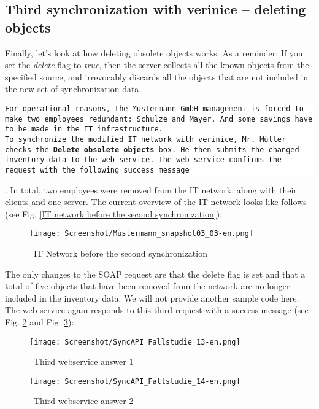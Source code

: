 \documentclass[a4paper,10pt]{book}
\begin{document}
\subsection{ Third synchronization with verinice – deleting objects}
Finally, let's look at how deleting obsolete objects works. As a reminder: If you set the \textit{delete} flag to \textit{true}, then
the server collects all the known objects from the specified source, and irrevocably discards all the objects that are not included
in the new set of synchronization data.
\newline
\newline
\colorbox{white}{\parbox{\textwidth}{
{\tt For operational reasons, the Mustermann GmbH management is forced to make two employees redundant: Schulze and Mayer. And some
savings have to be made in the IT infrastructure.
\newline\\
To synchronize the modified IT network with verinice, Mr. Müller checks the \textbf{Delete obsolete objects} box. He then submits the
changed inventory data to the web service. The web service confirms the request with the following success message}}}.
\newline
\newline
In total, two employees were removed from the IT network, along with their clients and one server. The current overview of the IT network
looks like follows (see Fig. \ref{IT network before the second synchronization}):
\newline
\begin{figure}[htb!]
  \centering
  \texttt{[image: Screenshot/Mustermann\_snapshot03\_03-en.png]}
  \caption{\label{IT Network before the second synchronization} \ IT Network before the second synchronization}
\end{figure}
\newline
The only changes to the SOAP request are that the delete flag is set and that a total of five objects that have been removed from the
network are no longer included in the inventory data. We will not provide another sample code here.
\newline\\
The web service again responds to this third request with a success message (see Fig. \ref{Third webservice answer 1} and Fig. \ref{Third webservice answer 2}):
\newline
\begin{figure}[htb!]
  \centering
  \texttt{[image: Screenshot/SyncAPI\_Fallstudie\_13-en.png]}
  \caption{\label{Third webservice answer 1} \ Third webservice answer 1}
\end{figure}
\newline
\begin{figure}[htb!]
  \centering
  \texttt{[image: Screenshot/SyncAPI\_Fallstudie\_14-en.png]}
  \caption{\label{Third webservice answer 2} \ Third webservice answer 2}
\end{figure}
\newline
\end{document}
